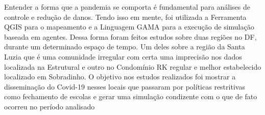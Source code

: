 
Entender a forma que a pandemia se comporta é fundamental para análises de controle e redução de danos. Tendo isso em mente, foi utilizada a Ferramenta QGIS para o mapeamento e a Linguagem GAMA para a execução de simulação baseada em agentes. Dessa forma foram feitos estudos sobre duas regiões no DF, durante um determinado espaço de tempo. Um deles sobre a região da Santa Luzia que é uma comunidade irregular com certa uma imprecisão nos dados localizada na Estrutural e outro no Condomínio RK regular e melhor estabelecido localizado em Sobradinho. O objetivo nos estudos realizados foi mostrar a disseminação do Covid-19 nesses locais que passaram por políticas restritivas como fechamento de escolas e gerar uma simulação condizente com o que de fato ocorreu no período analisado
